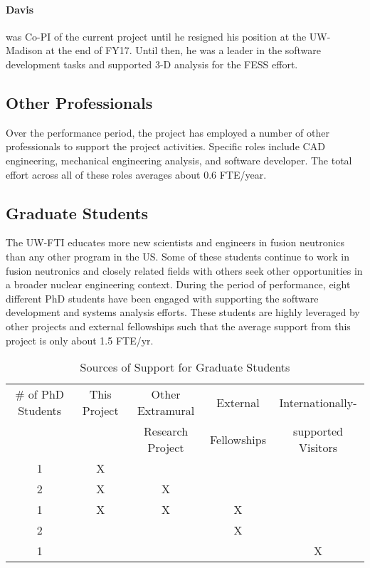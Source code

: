 \paragraph{Davis} was Co-PI of the current project until he resigned his
position at the UW-Madison at the end of FY17.  Until then, he was a leader in
the software development tasks and supported 3-D analysis for the \gls{FESS}
effort.

\subsection{Other Professionals}

Over the performance period, the project has employed a number of other
professionals to support the project activities.  Specific roles include CAD
engineering, mechanical engineering analysis, and software developer.  The
total effort across all of these roles averages about 0.6 FTE/year.

\subsection{Graduate Students}

The \gls{UW-FTI} educates more new scientists and engineers in fusion
neutronics than any other program in the US.  Some of these students continue
to work in fusion neutronics and closely related fields with others seek other
opportunities in a broader nuclear engineering context. During the period of
performance, eight different PhD students have been engaged with supporting
the software development and systems analysis efforts.  These students are
highly leveraged by other projects and external fellowships such that the
average support from this project is only about 1.5 FTE/yr.

\begin{table*}[h]
  \centering
  \caption{Sources of Support for Graduate Students}
  \begin{tabular}{|c|c|c|c|c|}\hline
    \# of PhD Students & This Project & Other Extramural  & External    & Internationally- \\
    &              & Research Project  & Fellowships & supported Visitors    \\\hline
    1 & X &   &   &   \\\hline
    2 & X & X &   &   \\\hline
    1 & X & X & X &   \\\hline
    2 &   &   & X &   \\\hline
    1 &   &   &   & X \\\hline
  \end{tabular}
\end{table*}

